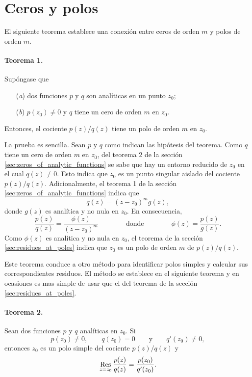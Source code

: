 \documentclass[a4paper]{report}
\def\Res{\qopname\relax m{Res}}
\begin{document}
\section{Ceros y polos}\label{sec:zeros_and_poles}

El siguiente teorema establece una conexión entre ceros de orden \(m\) y polos de orden \(m\).

\paragraph{Teorema 1.} Supóngase que 
\begin{enumerate}
 \item[(\textit{a})] dos funciones \(p\) y \(q\) son analíticas en un punto \(z_0\);
 \item[(\textit{b})] \(p(z_0)\neq0\) y \(q\) tiene un cero de orden \(m\) en \(z_0\).
\end{enumerate}
Entonces, el cociente \(p(z)/q(z)\) tiene un polo de orden \(m\) en \(z_0\). 

La prueba es sencilla. Sean \(p\) y \(q\) como indican las hipótesis del teorema. Como \(q\) tiene un cero de orden \(m\) en \(z_0\), del teorema 2 de la sección \ref{sec:zeros_of_analytic_functions} se sabe que hay un entorno reducido de \(z_0\) en el cual \(q(z)\neq0\). Esto indica que \(z_0\) es un punto singular aislado del cociente \(p(z)/q(z)\). Adicionalmente, el teorema 1 de la sección \ref{sec:zeros_of_analytic_functions} indica que 
\[
 q(z)=(z-z_0)^mg(z),
\]
donde \(g(z)\) es analítica y no nula en \(z_0\). En consecuencia,
\begin{equation}\label{eq:zeros_and_poles_quotient_phi}
 \frac{p(z)}{q(z)}=\frac{\phi(z)}{(z-z_0)^m}
 \qquad\qquad\textrm{donde}\qquad\qquad
 \phi(z)=\frac{p(z)}{g(z)}. 
\end{equation}
Como \(\phi(z)\) es analítica y no nula en \(z_0\), el teorema de la sección \ref{sec:residues_at_poles} indica que \(z_0\) es un polo de orden \(m\) de \(p(z)/q(z)\).  

Este teorema conduce a otro método para identificar polos simples y calcular sus correspondientes residuos. El método se establece en el siguiente teorema y en ocasiones es mas simple de usar que el del teorema de la sección \ref{sec:residues_at_poles}.

\paragraph{Teorema 2.} Sean dos funciones \(p\) y \(q\) analíticas en \(z_0\). Si 
\[
 p(z_0)\neq0,\qquad 
 q(z_0)=0\qquad\textrm{y}\qquad 
 q'(z_0)\neq0,
\]
entonces \(z_0\) es un polo simple del cociente \(p(z)/q(z)\) y 
\begin{equation}\label{eq:zeros_and_poles_quotient_residue_order_1}
 \Res_{z=z_0}\frac{p(z)}{q(z)}=\frac{p(z_0)}{q'(z_0)}. 
\end{equation}
\end{document}
